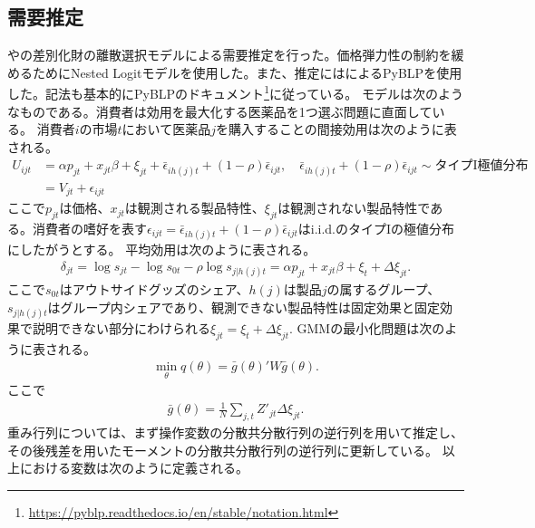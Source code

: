 \documentclass[a4paper,11pt,uplatex]{jsarticle}
\theoremstyle{definition}
\begin{document}
\subsection{需要推定}
\cite{Berry1994}や\cite{BLP}の差別化財の離散選択モデルによる需要推定を行った。価格弾力性の制約を緩めるためにNested Logitモデルを使用した。また、推定には\cite{ConlonGortmaker}によるPyBLPを使用した。記法も基本的にPyBLPのドキュメント\footnote{\url{https://pyblp.readthedocs.io/en/stable/notation.html}}に従っている。
モデルは次のようなものである。消費者は効用を最大化する医薬品を1つ選ぶ問題に直面している。
消費者\(i\)の市場\(t\)において医薬品\(j\)を購入することの間接効用は次のように表される。
\begin{align*}
U_{ijt}&=\alpha p_{jt} + x_{jt} \beta + \xi_{jt} + \bar\epsilon_{ih(j)t}+(1-\rho)\bar \epsilon_{ijt}, \quad \bar\epsilon_{ih(j)t}+(1-\rho) \bar \epsilon_{ijt} \sim \textrm{タイプI極値分布}\\
&=V_{jt}+\epsilon_{ijt}
\end{align*}
ここで\(p_{jt}\)は価格、\(x_{jt}\)は観測される製品特性、\(\xi_{jt}\)は観測されない製品特性である。消費者の嗜好を表す\(\epsilon_{ijt}=\bar\epsilon_{ih(j)t}+(1-\rho)\bar \epsilon_{ijt}\)はi.i.d.のタイプIの極値分布にしたがうとする。
平均効用は次のように表される。
\begin{align*}
\delta_{jt}=\log s_{jt}-\log s_{0t}-\rho \log s_{j | h(j)t}=\alpha p_{jt} + x_{jt} \beta +\xi_t+\Delta \xi_{jt}.
\end{align*}
ここで\(s_{0t}\)はアウトサイドグッズのシェア、\(h(j)\)は製品\(j\)の属するグループ、\(s_{j | h(j)t}\)はグループ内シェアであり、観測できない製品特性は固定効果と固定効果で説明できない部分にわけられる\(\xi_{jt}=\xi_t+\Delta \xi_{jt}\).
GMMの最小化問題は次のように表される。
\begin{align*}
\min_\theta q(\theta)=\bar g(\theta)'W \bar g(\theta).
\end{align*}
ここで
\begin{align*}
\bar g(\theta)=\frac{1}{N} \sum _{j,t} Z'_{jt} \Delta\xi_{jt}.
\end{align*}
重み行列については、まず操作変数の分散共分散行列の逆行列を用いて推定し、その後残差を用いたモーメントの分散共分散行列の逆行列に更新している。
以上における変数は次のように定義される。
\end{document}
